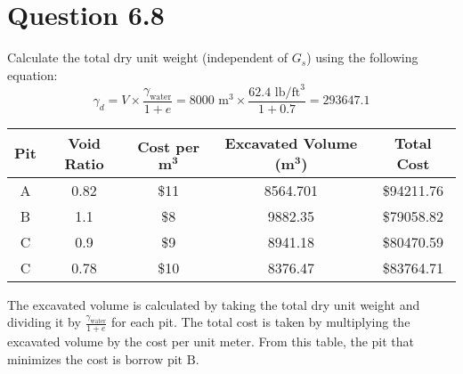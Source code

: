 \documentclass{article}
\begin{document}
\section*{Question 6.8}
Calculate the total dry unit weight (independent of $G_s$) using the following equation: 
\[\gamma_d=V\times \frac{\gamma_\text{water}}{1+e}=8000\text{ m}^3\times\frac{62.4\text{ lb}/\text{ft}^3}{1+0.7}=293647.1\]
\begin{center}
    \begin{tabular}{|c|c|c|c|c|}
        \hline
        \textbf{Pit} & \textbf{Void Ratio} & \textbf{Cost per $\bm{\textbf{m}^3}$} & \textbf{Excavated Volume ($\bm{\text{m}^3}$)} & \textbf{Total Cost}  \\\hline
        A   & 0.82                  & \$11                        & 8564.701                   & \$94211.76                  \\\hline
        B   & 1.1                   & \$8                          & 9882.35                   & \$79058.82                  \\\hline
        C   & 0.9                   & \$9                       & 8941.18                   & \$80470.59                  \\\hline
        C   & 0.78                  & \$10                       & 8376.47                   & \$83764.71                 \\\hline
    \end{tabular}
\end{center}
\vspace{3mm} 
The excavated volume is calculated by taking the total dry unit weight and dividing it by $\frac{\gamma_\text{water}}{1+e}$ for each pit. The total cost is taken by multiplying the excavated volume by the cost per unit meter. From this table, the pit that minimizes the cost is $\boxed{\text{borrow pit B}}$.
\end{document}
